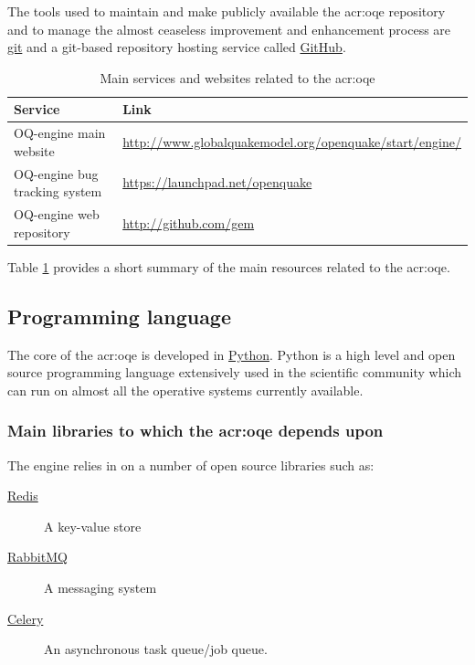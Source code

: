 The tools used to maintain and make publicly available the \gls{acr:oqe} 
repository and to manage the almost ceaseless improvement and enhancement 
process are \href{http://git-scm.com/}{git} and a git-based repository 
hosting service called \href{http://github.com/}{GitHub}.
%
\begin{table}[!t]
\centering
\begin{tabular}{p{4cm}p{9cm}}
\hline
\rowcolor{anti-flashwhite}
\bf{Service} & \bf{Link}  \\
\hline 
OQ-engine main website & 
    \href{http://www.globalquakemodel.org/openquake/start/engine/}
        {http://www.globalquakemodel.org/openquake/start/engine/} \\
OQ-engine bug tracking system & 
    \href{https://launchpad.net/openquake}{https://launchpad.net/openquake} \\
OQ-engine web repository & 
    \href{http://github.com/gem}{http://github.com/gem} \\
\hline
\end{tabular}
\label{tab:development_tools}
\caption{Main services and websites related to the \gls{acr:oqe}}
\end{table}
Table \ref{tab:development_tools} provides a short summary of the main 
resources related to the \gls{acr:oqe}.
%
\subsection{Programming language}
The core of the \gls{acr:oqe} is developed in 
\href{https://www.python.org/}{Python}. Python is a high level and open 
source programming language extensively used in the scientific community 
which can run on almost all the operative systems currently available.
%
\subsubsection{Main libraries to which the \gls{acr:oqe} depends upon}
The engine relies in on a number of open source libraries such as:
\begin{description}
    \item [\href{http://redis.io/}{Redis}] A key-value store
    \item [\href{https://www.rabbitmq.com/}{RabbitMQ}] A messaging system
    \item [\href{http://www.celeryproject.org/}{Celery}] An asynchronous 
        task queue/job queue.
\end{description}
%
